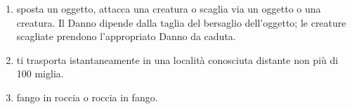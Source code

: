 \documentclass[itdr]{subfiles}
\begin{document}
\begin{enumerate}
	\item {} sposta un oggetto, attacca una creatura o scaglia via un oggetto o una creatura. Il Danno \mbox{dipende} dalla taglia del bersaglio dell'oggetto; le creature scagliate prendono l'appropriato Danno da caduta.
	\item {} ti trasporta istantaneamente in una località conosciuta distante non più di 100 miglia.
	\item {} fango in roccia o roccia in fango.
\end{enumerate}

\vfill
\break
\end{document}
